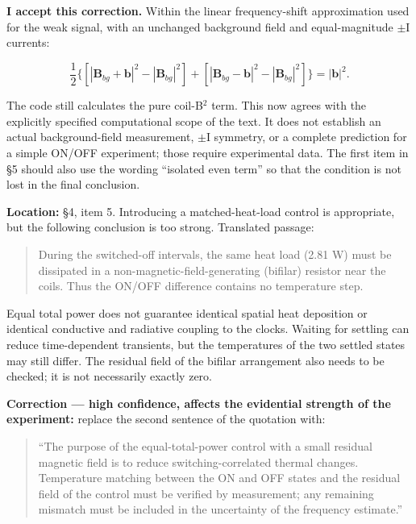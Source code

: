 \documentclass[10pt,a4paper]{article}
\begin{document}
{\begin{quote}
\end{quote}
\par
\textbf{I accept this correction.} Within the linear frequency-shift approximation used for the weak signal, with an unchanged background field and equal-magnitude $\pm$I currents:
\par
\[\frac{1}{2}\{[|\mathbf B_{bg}+\mathbf b|^2-|\mathbf B_{bg}|^2] +[|\mathbf B_{bg}-\mathbf b|^2-|\mathbf B_{bg}|^2]\}=|\mathbf b|^2.\]
\par
The code still calculates the pure coil-B$^2$ term. This now agrees with the explicitly specified computational scope of the text. It does not establish an actual background-field measurement, $\pm$I symmetry, or a complete prediction for a simple ON/OFF experiment; those require experimental data. The first item in \S5 should also use the wording ``isolated even term'' so that the condition is not lost in the final conclusion.
\par
\vspace{2pt}\par\vspace{0.5pt}
\par
\textbf{Location:} \S4, item 5. Introducing a matched-heat-load control is appropriate, but the following conclusion is too strong. Translated passage:
\par
\begin{quote}\vspace{-3pt}
During the switched-off intervals, the same heat load (2.81 W) must be dissipated in a non-magnetic-field-generating (bifilar) resistor near the coils. Thus the ON/OFF difference contains no temperature step.

\end{quote}
\par
Equal total power does not guarantee identical spatial heat deposition or identical conductive and radiative coupling to the clocks. Waiting for settling can reduce time-dependent transients, but the temperatures of the two settled states may still differ. The residual field of the bifilar arrangement also needs to be checked; it is not necessarily exactly zero.
\par
\textbf{Correction --- high confidence, affects the evidential strength of the experiment:} replace the second sentence of the quotation with:
\par
\begin{quote}\vspace{-3pt}
``The purpose of the equal-total-power control with a small residual magnetic field is to reduce switching-correlated thermal changes. Temperature matching between the ON and OFF states and the residual field of the control must be verified by measurement; any remaining mismatch must be included in the uncertainty of the frequency estimate.''


\end{quote}}
\end{document}
